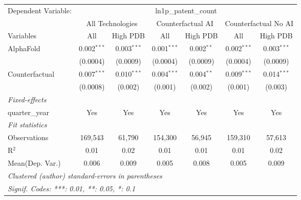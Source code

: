 \begingroup
\centering
\begin{tabular}{lcccccc}
   \tabularnewline \midrule \midrule
   Dependent Variable: & \multicolumn{6}{c}{ln1p\_patent\_count}\\
 & \multicolumn{2}{c}{All Technologies} & \multicolumn{2}{c}{Counterfactual AI} & \multicolumn{2}{c}{Counterfactual No AI} \\
\cmidrule(lr){1-1}\cmidrule(lr){2-3} \cmidrule(lr){4-5} \cmidrule(lr){6-7}
Variables & \multicolumn{1}{c}{All} & \multicolumn{1}{c}{High PDB} & \multicolumn{1}{c}{All} & \multicolumn{1}{c}{High PDB} & \multicolumn{1}{c}{All} & \multicolumn{1}{c}{High PDB} \\
\cmidrule(lr){1-1}\cmidrule(lr){2-2} \cmidrule(lr){3-3} \cmidrule(lr){4-4} \cmidrule(lr){5-5} \cmidrule(lr){6-6} \cmidrule(lr){7-7}
   AlphaFold      & 0.002$^{***}$ & 0.003$^{***}$ & 0.001$^{***}$ & 0.002$^{**}$ & 0.002$^{***}$ & 0.003$^{***}$\\   
                  & (0.0004)      & (0.0009)      & (0.0004)      & (0.0009)     & (0.0004)      & (0.0009)\\   
   Counterfactual & 0.007$^{***}$ & 0.010$^{***}$ & 0.004$^{***}$ & 0.004$^{**}$ & 0.009$^{***}$ & 0.014$^{***}$\\   
                  & (0.0008)      & (0.002)       & (0.001)       & (0.002)      & (0.001)       & (0.003)\\   
   \midrule
   \emph{Fixed-effects}\\
   quarter\_year  & Yes           & Yes           & Yes           & Yes          & Yes           & Yes\\  
   \midrule
   \emph{Fit statistics}\\
   Observations   & 169,543       & 61,790        & 154,300       & 56,945       & 159,310       & 57,613\\  
   R$^2$          & 0.01          & 0.02          & 0.01          & 0.01         & 0.01          & 0.02\\  
Mean(Dep. Var.) & 0.006 & 0.009 & 0.005 & 0.008 & 0.005 & 0.009 \\
   \midrule \midrule
   \multicolumn{7}{l}{\emph{Clustered (author) standard-errors in parentheses}}\\
   \multicolumn{7}{l}{\emph{Signif. Codes: ***: 0.01, **: 0.05, *: 0.1}}\\
\end{tabular}
\par\endgroup
